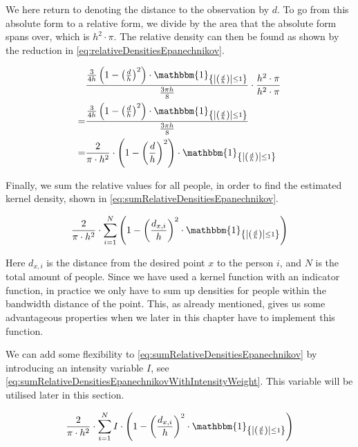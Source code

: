 We here return to denoting the distance to the observation by $d$. To go from this absolute form to a relative form, we divide by the area that the absolute form spans over, which is $h^2 \cdot \pi$. The relative density can then be found as shown by the reduction in \cref{eq:relativeDensitiesEpanechnikov}.

\begin{equation}
\label{eq:relativeDensitiesEpanechnikov}
\begin{split}
&\frac{\frac{3}{4 h} \left(1 - \left(\frac{d}{h}\right)^2\right) \cdot \mathbbm{1}_{\left\{\left|\left(\frac{d}{h}\right)\right| \leq 1\right\}}}{\frac{3 \pi h}{8}} \cdot \frac{h^2 \cdot \pi}{h^2 \cdot \pi}\\
= &\frac{\frac{3}{4 h} \left(1 - \left(\frac{d}{h}\right)^2\right) \cdot \mathbbm{1}_{\left\{\left|\left(\frac{d}{h}\right)\right| \leq 1\right\}}}{\frac{3 \pi h}{8}}\\
= &\frac{2}{\pi \cdot h^2} \cdot \left(1-\left(\frac{d}{h}\right)^2\right) \cdot \mathbbm{1}_{\left\{\left|\left(\frac{d}{h}\right)\right| \leq 1\right\}}
\end{split}
\end{equation}

Finally, we sum the relative values for all people, in order to find the estimated kernel density, shown in \cref{eq:sumRelativeDensitiesEpanechnikov}.

\begin{equation}
\label{eq:sumRelativeDensitiesEpanechnikov}
\frac{2}{\pi \cdot h^2} \cdot \sum_{i=1}^N \left(1-\left(\frac{d_{x,i}}{h}\right)^2 \cdot \mathbbm{1}_{\left\{\left|\left(\frac{d}{h}\right)\right| \leq 1\right\}}\right)
\end{equation}

Here $d_{x,i}$ is the distance from the desired point $x$ to the person $i$, and $N$ is the total amount of people. Since we have used a kernel function with an indicator function, in practice we only have to sum up densities for people within the bandwidth distance of the point. This, as already mentioned, gives us some advantageous properties when we later in this chapter have to implement this function.

We can add some flexibility to \cref{eq:sumRelativeDensitiesEpanechnikov} by introducing an intensity variable $I$, see  \cref{eq:sumRelativeDensitiesEpanechnikovWithIntensityWeight}. This variable will be utilised later in this section.

\begin{equation}
\label{eq:sumRelativeDensitiesEpanechnikovWithIntensityWeight}
\frac{2}{\pi \cdot h^2} \cdot \sum_{i=1}^N I \cdot \left(1-\left(\frac{d_{x,i}}{h}\right)^2 \cdot \mathbbm{1}_{\left\{\left|\left(\frac{d}{h}\right)\right| \leq 1\right\}}\right)
\end{equation}

